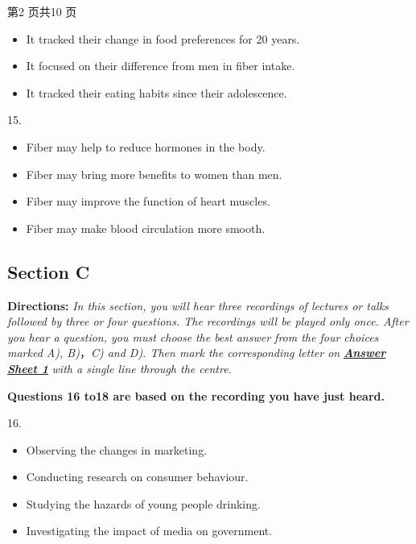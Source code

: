 \documentclass[UTF8,11pt]{ctexart}
\begin{document}
第2 页共10 页


\begin{itemize}[leftmargin=2em,itemsep=.2em,topsep=.4em]\item[B.] It tracked their change in food preferences for 20 years.
\item[C.] It focused on their difference from men in fiber intake.
\item[D.] It tracked their eating habits since their adolescence.
\end{itemize}

15.


\begin{itemize}[leftmargin=2em,itemsep=.2em,topsep=.4em]\item[A.] Fiber may help to reduce hormones in the body.
\item[B.] Fiber may bring more benefits to women than men.
\item[C.] Fiber may improve the function of heart muscles.
\item[D.] Fiber may make blood circulation more smooth.
\end{itemize}

\subsection*{\textbf{Section C}}


\textbf{Directions:}\textit{ In this section, you will hear three recordings of lectures or talks followed by three or} \textit{four questions. The recordings will be played only once. After you hear a question, you must choose} \textit{the best answer from the four choices marked A), B)}，\textit{C) and D). Then mark the corresponding letter on} \textbf{\textit{\uline{Answer Sheet 1}}}\textit{ with a single line through the centre.}


\textbf{Questions 16 to18 are based on the recording you have just heard.}


16.


\begin{itemize}[leftmargin=2em,itemsep=.2em,topsep=.4em]\item[A.] Observing the changes in marketing.
\item[B.] Conducting research on consumer behaviour.
\item[C.] Studying the hazards of young people drinking.
\item[D.] Investigating the impact of media on government.
\end{itemize}
\end{document}
